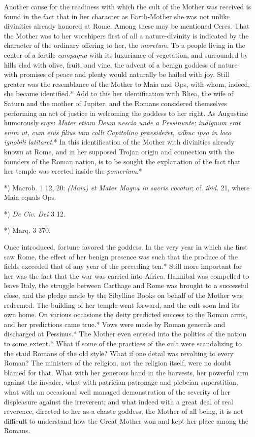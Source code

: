 \documentclass[a4paper, 11pt, oneside, polutonikogreek, english]{article}
\begin{document}
Another cause for the readiness with which the cult of the Mother was received is found in the fact that in her character as Earth-Mother she was not unlike divinities already honored at Rome. Among these may be mentioned Ceres. That the Mother was to her worshipers first of all a nature-divinity is indicated by the character of the ordinary offering to her, the \emph{moretum}. To a people living in the center of a fertile \emph{campagna} with its luxuriance of vegetation, and surrounded by hills clad with olive, fruit, and vine, the advent of a benign goddess of nature with promises of peace and plenty would naturally be hailed with joy. Still greater was the resemblance of the Mother to Maia and Ops, with whom, indeed, she became identified.* Add to this her identification with Rhea, the wife of Saturn and the mother of Jupiter, and the Romans considered themselves performing an act of justice in welcoming the goddess to her right. As Augustine humorously says: \emph{Mater etiam Deum nescio unde a Pessinunte; indignum erat enim ut, cum eius filius iam colli Capitolino praesideret, adhuc ipsa in loco ignobili latitaret}.* In this identification of the Mother with divinities already known at Rome, and in her supposed Trojan origin and connection with the founders of the Roman nation, is to be sought the explanation of the fact that her temple was erected inside the \emph{pomerium}.*

*) Macrob. 1 12, 20: \emph{(Maia) et Mater Magna in sacris vocatur}; cf. \emph{ibid.} 21, where Maia equals Ops.

*) \emph{De Civ. Dei} 3 12.

*) Marq. 3 370.

Once introduced, fortune favored the goddess. In the very year in which she first saw Rome, the effect of her benign presence was such that the produce of the fields exceeded that of any year of the preceding ten.* Still more important for her was the fact that the war was carried into Africa. Hannibal was compelled to leave Italy, the struggle between Carthage and Rome was brought to a successful close, and the pledge made by the Sibylline Books on behalf of the Mother was redeemed. The building of her temple went forward, and the cult soon had its own home. On various occasions the deity predicted success to the Roman arms, and her predictions came true.* Vows were made by Roman generals and discharged at Pessinus.* The Mother even entered into the politics of the nation to some extent.* What if some of the practices of the cult were scandalizing to the staid Romans of the old style? What if one detail was revolting to every Roman? The ministers of the religion, not the religion itself, were no doubt blamed for that. What with her generous hand in the harvests, her powerful arm against the invader, what with patrician patronage and plebeian superstition, what with an occasional well managed demonstration of the severity of her displeasure against the irreverent; and what indeed with a great deal of real reverence, directed to her as a chaste goddess, the Mother of all being, it is not difficult to understand how the Great Mother won and kept her place among the Romans.
\end{document}
